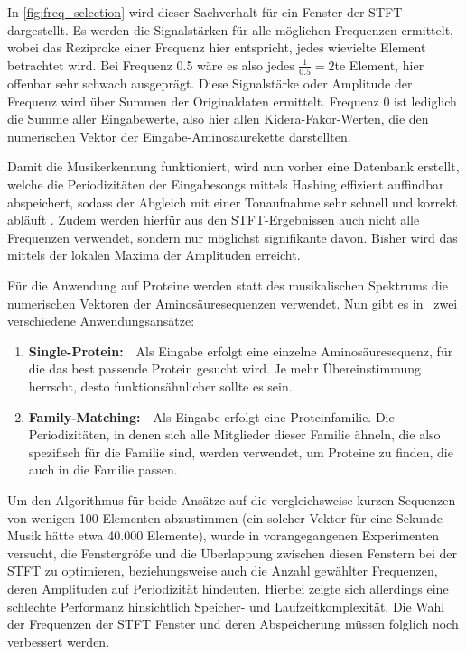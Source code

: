     In \autoref{fig:freq_selection} wird dieser Sachverhalt für ein Fenster der STFT dargestellt. Es werden die Signalstärken für alle möglichen Frequenzen ermittelt, wobei das Reziproke einer Frequenz hier entspricht, jedes wievielte Element betrachtet wird. Bei Frequenz 0.5 wäre es also jedes $\frac{1}{0.5} = 2$te Element, hier offenbar sehr schwach ausgeprägt. Diese Signalstärke oder Amplitude der Frequenz wird über Summen der Originaldaten ermittelt. Frequenz 0 ist lediglich die Summe aller Eingabewerte, also hier allen Kidera-Fakor-Werten, die den numerischen Vektor der Eingabe-Aminosäurekette darstellten.

    Damit die Musikerkennung funktioniert, wird nun vorher eine Datenbank erstellt, welche die Periodizitäten der Eingabesongs mittels Hashing effizient auffindbar abspeichert, sodass der Abgleich mit einer Tonaufnahme sehr schnell und korrekt abläuft . Zudem werden hierfür aus den STFT-Ergebnissen auch nicht alle Frequenzen verwendet, sondern nur möglichst signifikante davon. Bisher wird das mittels der lokalen Maxima der Amplituden erreicht.

    Für die Anwendung auf Proteine werden statt des musikalischen Spektrums die numerischen Vektoren der Aminosäuresequenzen verwendet. Nun gibt es in \protfin\ zwei verschiedene Anwendungsansätze:
    \begin{enumerate}
        \item \textbf{Single-Protein:}\ \ Als Eingabe erfolgt eine einzelne Aminosäuresequenz, für die das best passende Protein gesucht wird. Je mehr Übereinstimmung herrscht, desto funktionsähnlicher sollte es sein.
        \item \textbf{Family-Matching:}\ \ Als Eingabe erfolgt eine Proteinfamilie. Die Periodizitäten, in denen sich alle Mitglieder dieser Familie ähneln, die also spezifisch für die Familie sind, werden verwendet, um Proteine zu finden, die auch in die Familie passen.
    \end{enumerate}
    Um den Algorithmus für beide Ansätze auf die vergleichsweise kurzen Sequenzen von wenigen 100 Elementen abzustimmen (ein solcher Vektor für eine Sekunde Musik hätte etwa 40.000 Elemente), wurde in vorangegangenen Experimenten versucht, die Fenstergröße und die Überlappung zwischen diesen Fenstern bei der STFT zu optimieren, beziehungsweise auch die Anzahl gewählter Frequenzen, deren Amplituden auf Periodizität hindeuten. Hierbei zeigte sich allerdings eine schlechte Performanz hinsichtlich Speicher- und Laufzeitkomplexität. Die Wahl der Frequenzen der STFT Fenster und deren Abspeicherung müssen folglich noch verbessert werden.

